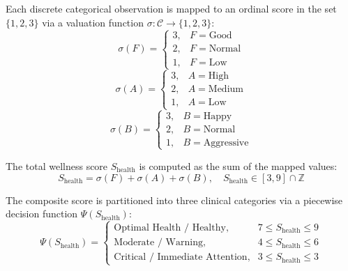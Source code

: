 \documentclass[conference]{IEEEtran}
\begin{document}
Each discrete categorical observation is mapped to an ordinal score in the set $\{1, 2, 3\}$ via a valuation function $\sigma: \mathcal{C} \to \{1, 2, 3\}$:
\begin{equation}
\sigma(F) = \begin{cases} 3, & F = \text{Good} \\ 2, & F = \text{Normal} \\ 1, & F = \text{Low} \end{cases}
\end{equation}
\begin{equation}
\sigma(A) = \begin{cases} 3, & A = \text{High} \\ 2, & A = \text{Medium} \\ 1, & A = \text{Low} \end{cases}
\end{equation}
\begin{equation}
\sigma(B) = \begin{cases} 3, & B = \text{Happy} \\ 2, & B = \text{Normal} \\ 1, & B = \text{Aggressive} \end{cases}
\end{equation}

The total wellness score $S_{\text{health}}$ is computed as the sum of the mapped values:
\begin{equation}
S_{\text{health}} = \sigma(F) + \sigma(A) + \sigma(B), \quad S_{\text{health}} \in [3, 9] \cap \mathbb{Z}
\end{equation}

The composite score is partitioned into three clinical categories via a piecewise decision function $\Psi(S_{\text{health}})$:
\begin{equation}
\Psi(S_{\text{health}}) = \begin{cases} 
\text{Optimal Health / Healthy}, & 7 \le S_{\text{health}} \le 9 \\ 
\text{Moderate / Warning}, & 4 \le S_{\text{health}} \le 6 \\ 
\text{Critical / Immediate Attention}, & 3 \le S_{\text{health}} \le 3 
\end{cases}
\end{equation}
\end{document}
